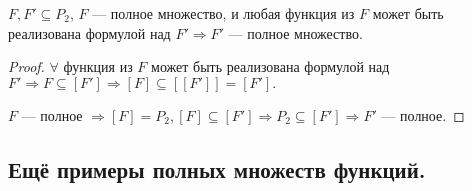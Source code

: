 \begin{lemma}
	$F, F' \subseteq P_2$, $F$ --- полное множество, и любая функция из $F$ может быть реализована формулой над $F' \Rightarrow F'$ --- полное множество.
\end{lemma}
\begin{proof}
	$\forall$ функция из $F$ может быть реализована формулой над $F' \Rightarrow F \subseteq [F'] \Rightarrow [F] \subseteq [[F']] = [F'].$

	$F$ --- полное $\Rightarrow [F] = P_2, [F] \subseteq [F'] \Rightarrow P_2 \subseteq [F'] \Rightarrow F'$ --- полное.
\end{proof}

\subsection{Ещё примеры полных множеств функций.}

